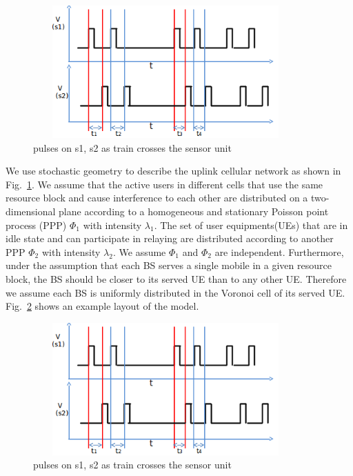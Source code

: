 \documentclass[titlepage]{article}
\begin{document}
\begin{figure}[H]
\begin{center}
\includegraphics[height = 2in,width=4in,angle=00]{figures/8w_no_miss.png}
\caption{\small pulses on s1, s2 as train crosses the sensor unit}
\label{fig:sysModel}
\end{center}
\end{figure}

\par We use stochastic geometry to
describe the uplink cellular network as shown in Fig.~\ref{fig:sysModel}. We
assume that the active users in different cells that use the same resource block and cause interference to each other are distributed on a two-dimensional plane according to a homogeneous and stationary Poisson point process (PPP)
$\Phi_1$ with intensity $\lambda_1$. The set of user equipments(UEs) that are in idle state and can participate in relaying are distributed according to another PPP $\Phi_2$ with intensity $\lambda_2$. We assume $\Phi_1$ and $\Phi_2$ are independent. Furthermore, under the assumption that each BS serves a
single mobile in a given resource block, the BS should be closer to its served UE than to any other UE. Therefore we assume each BS is uniformly distributed in the Voronoi cell of its served UE. Fig.~\ref{fig:netLayout} shows an example layout of the model.

\begin{figure}[H]
\begin{center}
\includegraphics[height = 2in,width=4in,angle=00]{figures/8w_no_miss.png}
\caption{\small pulses on s1, s2 as train crosses the sensor unit}
\label{fig:netLayout}
\end{center}
\end{figure}
\end{document}
